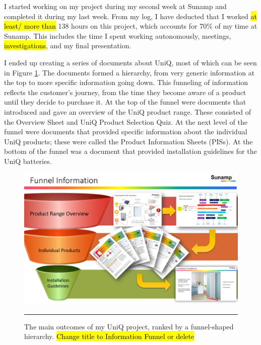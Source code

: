 I started working on my project during my second week at Sunamp and completed it during my last week.
From my log, I have deducted that I worked \hl{at least/ more than} 138 hours on this project, which accounts for 70\% of my time at Sunamp.
This includes the time I spent working autonomously, meetings, \hl{investigations}, and my final presentation.

I ended up creating a series of documents about UniQ, most of which can be seen in Figure \ref{funnel}.
The documents formed a hierarchy, from very generic information at the top to more specific information going down.
This funneling of information reflects the customer's journey, from the time they become aware of a product until they decide to purchase it.
At the top of the funnel were documents that introduced and gave an overview of the UniQ product range.
These consisted of the Overview Sheet and UniQ Product Selection Quiz.
At the next level of the funnel were documents that provided specific information about the individual UniQ products; these were called the Product Information Sheets (PISs).
At the bottom of the funnel was a document that provided installation guidelines for the UniQ batteries.


\begin{figure}[htbp]
	\centering
	\includegraphics[width=\textwidth]{figures/Funnel.PNG}
	\rule{\textwidth}{0.5pt} %
	\caption{The main outcomes of my UniQ project, ranked by a funnel-shaped hierarchy. \hl{Change title to Information Funnel or delete}}
	\label{funnel}
\end{figure}



